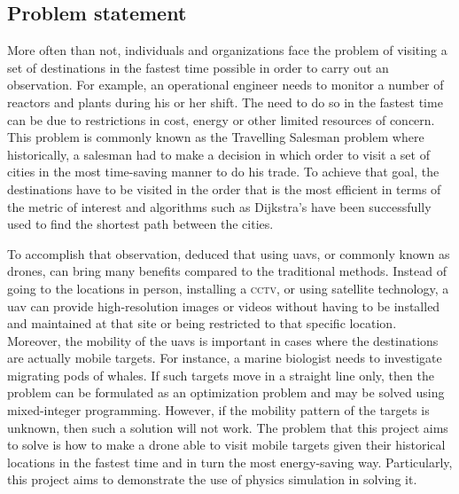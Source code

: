\documentclass[../main.tex]{subfiles}
\begin{document}
\subsection{Problem statement}

More often than not, individuals and organizations face the problem
of visiting a set of destinations in the fastest time possible
in order to carry out an observation.
For example, an operational engineer needs to monitor
a number of reactors and plants during his or her shift.
The need to do so in the fastest time can be due to restrictions in
cost, energy or other limited resources of concern.
This problem is commonly known as the Travelling Salesman problem
where historically, a salesman had to make a decision in which order
to visit a set of cities in the most time-saving manner to do his trade.
To achieve that goal, the destinations have to be visited in the order
that is the most efficient in terms of the metric of interest
and algorithms such as Dijkstra's have been successfully used 
to find the shortest path between the cities.

To accomplish that observation, \textcite{Sha19}
deduced that using \glspl{uav}, or commonly known as drones,
can bring many benefits 
compared to the traditional methods.
Instead of going to the locations in person, installing a \textsc{cctv},
or using satellite technology, a \gls{uav} can provide
high-resolution images or videos without 
having to be installed and maintained at that site
or being restricted to that specific location.
Moreover, the mobility of the \glspl{uav} is important
in cases where the destinations are actually mobile targets.
For instance, a marine biologist needs to investigate 
migrating pods of whales.
If such targets move in a straight line only,
then the problem can be formulated as an optimization problem
and may be solved using mixed-integer programming.
However, if the mobility pattern of the targets is unknown,
then such a solution will not work.
The problem that this project aims to solve is 
how to make a drone able to visit mobile targets 
given their historical locations in the fastest time
and in turn the most energy-saving way. 
Particularly, this project aims to demonstrate the 
use of physics simulation in solving it. 
\end{document}
